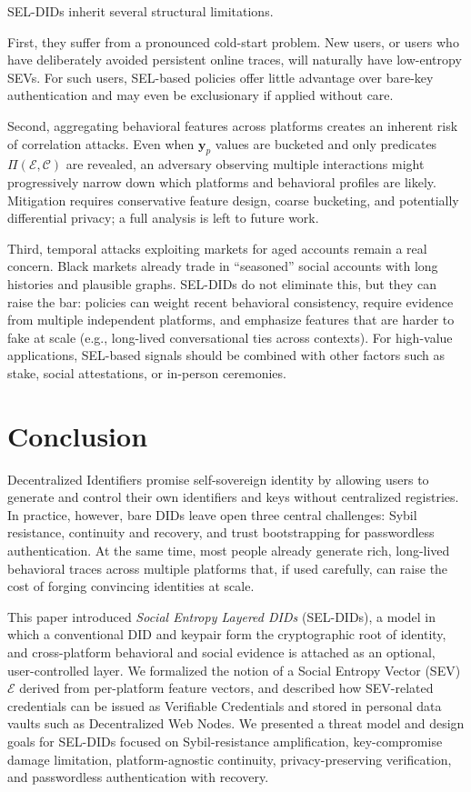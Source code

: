 \documentclass[11pt]{article}
\begin{document}
SEL-DIDs inherit several structural limitations.

First, they suffer from a pronounced cold-start problem. New users, or users who have deliberately avoided persistent online traces, will naturally have low-entropy SEVs. For such users, SEL-based policies offer little advantage over bare-key authentication and may even be exclusionary if applied without care.

Second, aggregating behavioral features across platforms creates an inherent risk of correlation attacks. Even when $\mathbf{y}_p$ values are bucketed and only predicates $\Pi(\mathcal{E}, \mathcal{C})$ are revealed, an adversary observing multiple interactions might progressively narrow down which platforms and behavioral profiles are likely. Mitigation requires conservative feature design, coarse bucketing, and potentially differential privacy; a full analysis is left to future work.

Third, temporal attacks exploiting markets for aged accounts remain a real concern. Black markets already trade in ``seasoned'' social accounts with long histories and plausible graphs. SEL-DIDs do not eliminate this, but they can raise the bar: policies can weight recent behavioral consistency, require evidence from multiple independent platforms, and emphasize features that are harder to fake at scale (e.g., long-lived conversational ties across contexts). For high-value applications, SEL-based signals should be combined with other factors such as stake, social attestations, or in-person ceremonies.

\section{Conclusion}

Decentralized Identifiers promise self-sovereign identity by allowing users to generate and control their own identifiers and keys without centralized registries. In practice, however, bare DIDs leave open three central challenges: Sybil resistance, continuity and recovery, and trust bootstrapping for passwordless authentication. At the same time, most people already generate rich, long-lived behavioral traces across multiple platforms that, if used carefully, can raise the cost of forging convincing identities at scale.

This paper introduced \emph{Social Entropy Layered DIDs} (SEL-DIDs), a model in which a conventional DID and keypair form the cryptographic root of identity, and cross-platform behavioral and social evidence is attached as an optional, user-controlled layer. We formalized the notion of a Social Entropy Vector (SEV) $\mathcal{E}$ derived from per-platform feature vectors, and described how SEV-related credentials can be issued as Verifiable Credentials and stored in personal data vaults such as Decentralized Web Nodes. We presented a threat model and design goals for SEL-DIDs focused on Sybil-resistance amplification, key-compromise damage limitation, platform-agnostic continuity, privacy-preserving verification, and passwordless authentication with recovery.
\end{document}

